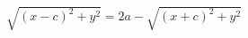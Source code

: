 \documentclass[preview]{standalone}
\begin{document}
\begin{align*}
\sqrt{(x-c)^2+y^2} = 2a - \sqrt{(x+c)^2+y^2}
\end{align*}
\end{document}
